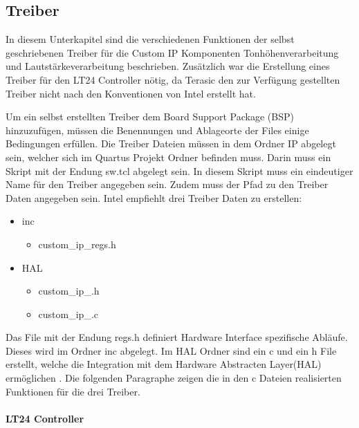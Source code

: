 \subsection{Treiber}\label{subsec:drivers}
In diesem Unterkapitel sind die verschiedenen Funktionen der selbst geschriebenen Treiber für die Custom IP Komponenten Tonhöhenverarbeitung und Lautstärkeverarbeitung beschrieben. Zusätzlich war die Erstellung eines Treiber für den LT24 Controller nötig, da Terasic den zur Verfügung gestellten Treiber nicht nach den Konventionen von Intel erstellt hat.

Um ein selbst erstellten Treiber dem Board Support Package (BSP) hinzuzufügen, müssen die Benennungen und Ablageorte der Files einige Bedingungen erfüllen.  
Die Treiber Dateien müssen in dem Ordner IP abgelegt sein, welcher sich im Quartus Projekt Ordner befinden muss. Darin muss ein Skript mit der Endung sw.tcl abgelegt sein. In diesem Skript muss ein eindeutiger Name für den Treiber angegeben sein. Zudem muss der Pfad zu den Treiber Daten angegeben sein. Intel empfiehlt drei Treiber Daten zu erstellen:
  \renewcommand{\labelitemi}{$\blacksquare$}
 \renewcommand\labelitemii{$\square$}
 \begin{itemize}
 	\item  inc
 	\begin{itemize}
 		\item  custom\_ip\_regs.h
 	\end{itemize}
 \end{itemize}
 \begin{itemize}
	\item  HAL
	\begin{itemize}
		\item  custom\_ip\_.h
		\item  custom\_ip\_.c
	\end{itemize}
\end{itemize}

Das File mit der Endung regs.h definiert Hardware Interface spezifische Abläufe. Dieses wird im Ordner inc abgelegt. Im HAL Ordner sind ein c und ein h File erstellt, welche die Integration mit dem Hardware Abstracten Layer(HAL) ermöglichen \cite{NIOS_II_soft}.
Die folgenden Paragraphe zeigen die in den c Dateien realisierten Funktionen für die drei Treiber.

\paragraph{LT24 Controller}\mbox{}\\

